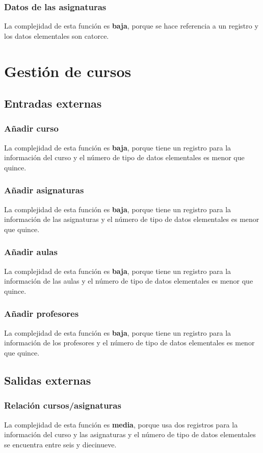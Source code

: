 \documentclass[11pt,a4paper,spanish,twoside]{book}
\begin{document}
\subsubsection{Datos de las asignaturas}
La complejidad de esta función es \textbf{baja}, porque se hace referencia a
un registro y los datos elementales son catorce.

\section{Gestión de cursos}
\subsection{Entradas externas}
\subsubsection{Añadir curso}
La complejidad de esta función es \textbf{baja}, porque tiene un
registro para la información del curso y el número de tipo de datos
elementales es menor que quince.

\subsubsection{Añadir asignaturas}
La complejidad de esta función es \textbf{baja}, porque tiene un
registro para la información de las asignaturas y el número de tipo de datos
elementales es menor que quince.

\subsubsection{Añadir aulas}
La complejidad de esta función es \textbf{baja}, porque tiene un
registro para la información de las aulas y el número de tipo de datos
elementales es menor que quince.

\subsubsection{Añadir profesores}
La complejidad de esta función es \textbf{baja}, porque tiene un
registro para la información de los profesores y el número de tipo de datos
elementales es menor que quince.

\subsection{Salidas externas}
\subsubsection{Relación cursos/asignaturas}
La complejidad de esta función es \textbf{media}, porque usa dos
registros para la información del curso y las asignaturas y el número de tipo
de datos elementales se encuentra entre seis y diecinueve.
\end{document}
